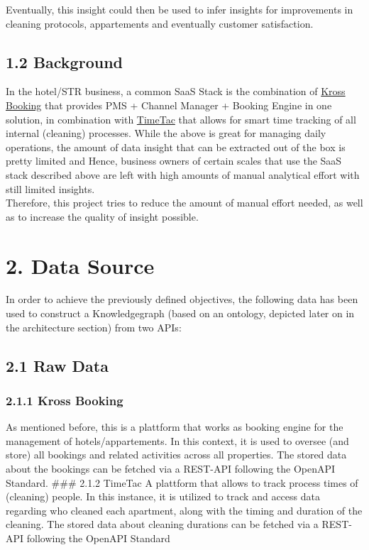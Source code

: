 \documentclass[
]{article}
\begin{document}
Eventually, this insight could then be used to infer insights for
improvements in cleaning protocols, appartements and eventually customer
satisfaction.

\subsection{1.2 Background}\label{background}

In the hotel/STR business, a common SaaS Stack is the combination of
\href{https://www.krossbooking.com/en}{Kross Booking} that provides PMS
+ Channel Manager + Booking Engine in one solution, in combination with
\href{https://www.timetac.com/en/}{TimeTac} that allows for smart time
tracking of all internal (cleaning) processes. While the above is great
for managing daily operations, the amount of data insight that can be
extracted out of the box is pretty limited and Hence, business owners of
certain scales that use the SaaS stack described above are left with
high amounts of manual analytical effort with still limited insights.\\
Therefore, this project tries to reduce the amount of manual effort
needed, as well as to increase the quality of insight possible.

\section{2. Data Source}\label{data-source}

In order to achieve the previously defined objectives, the following
data has been used to construct a Knowledgegraph (based on an ontology,
depicted later on in the architecture section) from two APIs:

\subsection{2.1 Raw Data}\label{raw-data}

\subsubsection{2.1.1 Kross Booking}\label{kross-booking}

As mentioned before, this is a plattform that works as booking engine
for the management of hotels/appartements. In this context, it is used
to oversee (and store) all bookings and related activities across all
properties. The stored data about the bookings can be fetched via a
REST-API following the OpenAPI Standard. \#\#\# 2.1.2 TimeTac A
plattform that allows to track process times of (cleaning) people. In
this instance, it is utilized to track and access data regarding who
cleaned each apartment, along with the timing and duration of the
cleaning. The stored data about cleaning durations can be fetched via a
REST-API following the OpenAPI Standard
\end{document}
